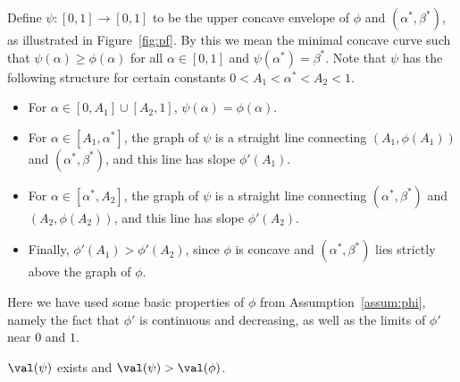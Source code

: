 \documentclass[11pt]{article}
\begin{document}
Define $\psi: [0,1] \to [0,1]$ to be the upper concave envelope of $\phi$ and $(\alpha^*,\beta^*)$, as illustrated in Figure~\ref{fig:pf}. By this we mean the minimal concave curve such that $\psi(\alpha) \ge \phi(\alpha)$ for all $\alpha \in [0,1]$ and $\psi(\alpha^*) = \beta^*$. Note that $\psi$ has the following structure for certain constants $0 < A_1 < \alpha^* < A_2 < 1$.
\begin{itemize}
\item For $\alpha \in [0,A_1] \cup [A_2,1]$, $\psi(\alpha) = \phi(\alpha)$.
\item For $\alpha \in [A_1,\alpha^*]$, the graph of $\psi$ is a straight line connecting $(A_1,\phi(A_1))$ and $(\alpha^*,\beta^*)$, and this line has slope $\phi'(A_1)$.
\item For $\alpha \in [\alpha^*,A_2]$, the graph of $\psi$ is a straight line connecting $(\alpha^*,\beta^*)$ and $(A_2,\phi(A_2))$, and this line has slope $\phi'(A_2)$.
\item Finally, $\phi'(A_1) > \phi'(A_2)$, since $\phi$ is concave and $(\alpha^*,\beta^*)$ lies strictly above the graph of $\phi$.
\end{itemize}
\noindent Here we have used some basic properties of $\phi$ from Assumption~\ref{assum:phi}, namely the fact that $\phi'$ is continuous and decreasing, as well as the limits of $\phi'$ near $0$ and $1$.

\begin{lemma}\label{lem:pushout}
$\val(\psi)$ exists and $\val(\psi) > \val(\phi)$.
\end{lemma}
\end{document}
